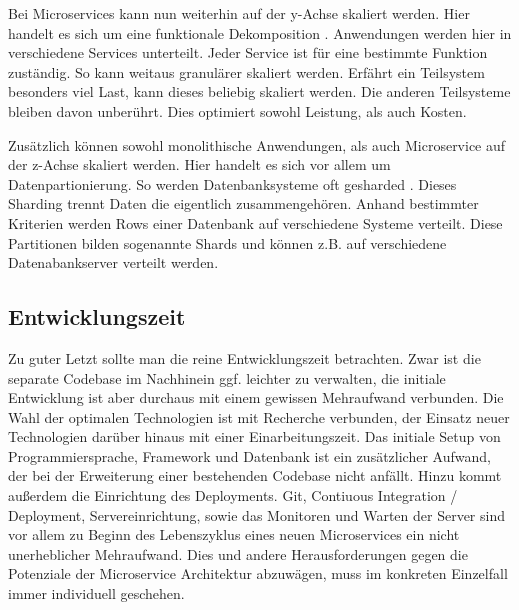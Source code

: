 Bei Microservices kann nun weiterhin auf der y-Achse skaliert werden. Hier handelt es sich um eine funktionale Dekomposition \cite[][]{abbott2009art}. Anwendungen werden hier in verschiedene Services unterteilt. Jeder Service ist für eine bestimmte Funktion zuständig. So kann weitaus granulärer skaliert werden. Erfährt ein Teilsystem besonders viel Last, kann dieses beliebig skaliert werden. Die anderen Teilsysteme bleiben davon unberührt. Dies optimiert sowohl Leistung, als auch Kosten.

Zusätzlich können sowohl monolithische Anwendungen, als auch Microservice auf der z-Achse skaliert werden. Hier handelt es sich vor allem um Datenpartionierung. So werden Datenbanksysteme oft gesharded \cite[][]{microsoft:sharding}. Dieses Sharding trennt Daten die eigentlich zusammengehören. Anhand bestimmter Kriterien werden Rows einer Datenbank auf verschiedene Systeme verteilt. Diese Partitionen bilden sogenannte Shards und können z.B. auf verschiedene Datenabankserver verteilt werden.

\subsection{Entwicklungszeit}
Zu guter Letzt sollte man die reine Entwicklungszeit betrachten. Zwar ist die separate Codebase im Nachhinein ggf. leichter zu verwalten, die initiale Entwicklung ist aber durchaus mit einem gewissen Mehraufwand verbunden. Die Wahl der optimalen Technologien ist mit Recherche verbunden, der Einsatz neuer Technologien darüber hinaus mit einer Einarbeitungszeit. Das initiale Setup von Programmiersprache, Framework und Datenbank ist ein zusätzlicher Aufwand, der bei der Erweiterung einer bestehenden Codebase nicht anfällt. Hinzu kommt außerdem die Einrichtung des Deployments. Git, Contiuous Integration / Deployment, Servereinrichtung, sowie das Monitoren und Warten der Server sind vor allem zu Beginn des Lebenszyklus eines neuen Microservices ein nicht unerheblicher Mehraufwand. Dies und andere Herausforderungen gegen die Potenziale der Microservice Architektur abzuwägen, muss im konkreten Einzelfall immer individuell geschehen.

